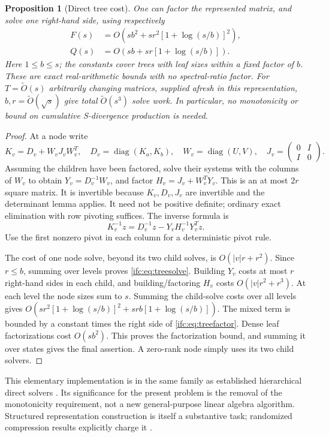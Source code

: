 \documentclass[11pt]{amsart}
\newtheorem{proposition}[theorem]{Proposition}
\theoremstyle{definition}\newtheorem{definition}[theorem]{Definition}
\theoremstyle{remark}\newtheorem{remark}[theorem]{Remark}
\numberwithin{equation}{section}
\newcommand{\diag}{\operatorname{diag}}
\begin{document}
\begin{proposition}[Direct tree cost]\label{ifc:prop:treecost}
One can factor the represented matrix, and solve one right-hand side,
using respectively
\begin{align}
 F(s)&=O\!\left(sb^2+sr^2[1+\log(s/b)]^2\right),\label{ifc:eq:treefactor}\\
 Q(s)&=O\!\left(sb+sr[1+\log(s/b)]\right).\label{ifc:eq:treesolve}
\end{align}
Here $1\le b\le s$; the constants cover trees with leaf sizes within
a fixed factor of $b$. These are exact real-arithmetic bounds with
no spectral-ratio factor. For $T=\widetilde O(s)$ arbitrarily changing
matrices, supplied afresh in this representation, $b,r=\widetilde
O(\sqrt s)$ give total $\widetilde O(s^3)$ solve work. In particular,
no monotonicity or bound on cumulative S-divergence production is needed.
\end{proposition}
\begin{proof}
At a node write
\[
 K_v=D_v+W_vJ_vW_v^T,\quad
 D_v=\diag(K_a,K_b),\quad W_v=\diag(U,V),\quad
 J_v=\begin{pmatrix}0&I\\I&0\end{pmatrix}.
\]
Assuming the children have been factored, solve their systems with the
columns of $W_v$ to obtain $Y_v=D_v^{-1}W_v$, and factor
$H_v=J_v+W_v^TY_v$. This is an at most $2r$ square matrix. It is
invertible because $K_v,D_v,J_v$ are invertible and the determinant
lemma applies. It need not be positive definite; ordinary exact
elimination with row pivoting suffices. The inverse formula is
\begin{equation}\label{ifc:eq:woodburytree}
 K_v^{-1}z=D_v^{-1}z-Y_vH_v^{-1}Y_v^Tz.
\end{equation}
Use the first nonzero pivot in each column for a deterministic pivot rule.

The cost of one node solve, beyond its two child solves, is
$O(|v|r+r^2)$. Since $r\le b$, summing over levels proves
\eqref{ifc:eq:treesolve}. Building $Y_v$ costs at most $r$ right-hand
sides in each child, and building/factoring $H_v$ costs
$O(|v|r^2+r^3)$. At each level the node sizes sum to $s$.
Summing the child-solve costs over all levels gives
$O(sr^2[1+\log(s/b)]^2+srb[1+\log(s/b)])$.
The mixed term is bounded by a constant times the right side of
\eqref{ifc:eq:treefactor}. Dense leaf factorizations cost $O(sb^2)$.
This proves the factorization bound, and summing it over states gives
the final assertion. A zero-rank node simply uses its two child solvers.
\end{proof}
This elementary implementation is in the same family as established
hierarchical direct solvers \cite{ulv,hierarchical}. Its significance
for the present problem is the removal of the monotonicity requirement,
not a new general-purpose linear algebra algorithm. Structured
representation construction is itself a substantive task; randomized
compression results explicitly charge it \cite{compression}.
\end{document}
